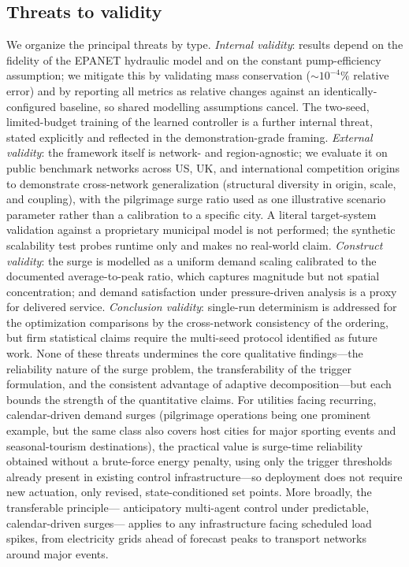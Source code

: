 \documentclass[11pt,a4paper]{article}
\begin{document}
\subsection{Threats to validity}
\label{sec:threats}
We organize the principal threats by type. \emph{Internal validity}: results
depend on the fidelity of the EPANET hydraulic model and on the constant
pump-efficiency assumption; we mitigate this by validating mass conservation
(${\sim}10^{-4}\%$ relative error) and by reporting all metrics as relative
changes against an identically-configured baseline, so shared modelling
assumptions cancel. The two-seed, limited-budget training of the learned
controller is a further internal threat, stated explicitly and reflected in the
demonstration-grade framing. \emph{External validity}: the framework itself is
network- and region-agnostic; we evaluate it on public benchmark networks across
US, UK, and international competition origins to demonstrate cross-network
generalization (structural diversity in origin, scale, and coupling), with the
pilgrimage surge ratio used as one illustrative scenario parameter rather than a
calibration to a specific city. A literal target-system validation against a
proprietary municipal model is not performed; the synthetic scalability test
probes runtime only and makes no real-world claim. \emph{Construct validity}: the surge is modelled as a uniform
demand scaling calibrated to the documented average-to-peak ratio, which captures
magnitude but not spatial concentration; and demand satisfaction under
pressure-driven analysis is a proxy for delivered service. \emph{Conclusion
validity}: single-run determinism is addressed for the optimization comparisons
by the cross-network consistency of the ordering, but firm statistical claims
require the multi-seed protocol identified as future work. None of these threats
undermines the core qualitative findings---the reliability nature of the surge
problem, the transferability of the trigger formulation, and the consistent
advantage of adaptive decomposition---but each bounds the strength of the
quantitative claims.
For utilities facing recurring, calendar-driven demand surges (pilgrimage
operations being one prominent example, but the same class also covers host
cities for major sporting events and seasonal-tourism destinations), the
practical value is surge-time reliability obtained without a brute-force energy
penalty, using only the trigger thresholds already present in existing control
infrastructure---so deployment does not require new actuation, only revised,
state-conditioned set points. More broadly, the transferable principle---
anticipatory multi-agent control under predictable, calendar-driven surges---
applies to any infrastructure facing scheduled load spikes, from electricity
grids ahead of forecast peaks to transport networks around major events.
\end{document}

